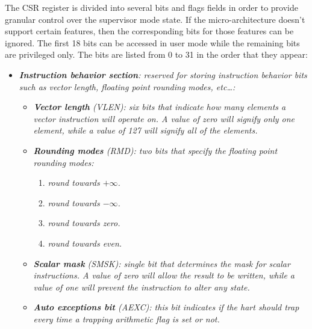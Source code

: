             The CSR register is divided into several bits and flags fields in order to provide granular control over the supervisor mode state. If the micro-architecture doesn't support certain features, then the corresponding bits for those features can be ignored. The first 18 bits can be accessed in user mode while the remaining bits are privileged only. The bits are listed from 0 to 31 in the order that they appear:

            \begin{itemize}

                \item \textit{\textbf{Instruction behavior section}: reserved for storing instruction behavior bits such as vector length, floating point rounding modes, etc\ldots:}

                    \begin{itemize}

                        \item \textit{\textbf{Vector length} (VLEN): six bits that indicate how many elements a vector instruction will operate on. A value of zero will signify only one element, while a value of 127 will signify all of the elements.}

                        \item \textit{\textbf{Rounding modes} (RMD): two bits that specify the floating point rounding modes:}

                            \begin{enumerate}

                                \item \textit{round towards \(+\infty\).}
                                \item \textit{round towards \(-\infty\).}
                                \item \textit{round towards zero.}
                                \item \textit{round towards even.}

                            \end{enumerate}

                        \item \textit{\textbf{Scalar mask} (SMSK): single bit that determines the mask for scalar instructions. A value of zero will allow the result to be written, while a value of one will prevent the instruction to alter any state.}

                        \item \textit{\textbf{Auto exceptions bit} (AEXC): this bit indicates if the hart should trap every time a trapping arithmetic flag is set or not.}


\end{itemize}
\end{itemize}

